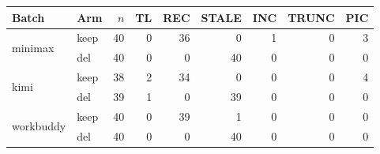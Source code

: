 \begin{tabular}{llrrrrrrr}
\toprule
Batch & Arm & $n$ & TL & REC & STALE & INC & TRUNC & PIC \\
\midrule
\multirow{2}{*}{minimax} & keep & 40 & 0 & 36 & 0 & 1 & 0 & 3 \\
 & del  & 40 & 0 & 0 & 40 & 0 & 0 & 0 \\
\midrule
\multirow{2}{*}{kimi} & keep & 38 & 2 & 34 & 0 & 0 & 0 & 4 \\
 & del  & 39 & 1 & 0 & 39 & 0 & 0 & 0 \\
\midrule
\multirow{2}{*}{workbuddy} & keep & 40 & 0 & 39 & 1 & 0 & 0 & 0 \\
 & del  & 40 & 0 & 0 & 40 & 0 & 0 & 0 \\
\bottomrule
\end{tabular}
